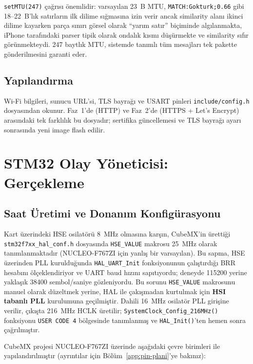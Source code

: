 \texttt{setMTU(247)} çağrısı önemlidir: varsayılan 23~B MTU,
\texttt{MATCH:Gokturk;0.66} gibi 18--22~B'lık satırların ilk dilime
sığmasına izin verir ancak similarity alanı ikinci dilime kayarken
parça sınırı görsel olarak ``yarım satır'' biçiminde algılanmakta,
iPhone tarafındaki parser tipik olarak ondalık kısmı düşürmekte ve
similarity sıfır görünmekteydi. 247 baytlık MTU, sistemde tanımlı tüm
mesajları tek pakette gönderilmesini garanti eder.

\subsection{Yapılandırma}

Wi-Fi bilgileri, sunucu URL'si, TLS bayrağı ve USART pinleri
\texttt{include/config.h} dosyasından okunur. Faz~1'de (HTTP) ve Faz~2'de
(HTTPS + Let's Encrypt) arasındaki tek farklılık bu dosyadır; sertifika
güncellemesi ve TLS bayrağı ayarı sonrasında yeni image flash edilir.

\section{STM32 Olay Yöneticisi: Gerçekleme}

\subsection{Saat Üretimi ve Donanım Konfigürasyonu}

Kart üzerindeki HSE osilatörü 8~MHz olmasına karşın, CubeMX'in
ürettiği \texttt{stm32f7xx\_hal\_conf.h} dosyasında \texttt{HSE\_VALUE}
makrosu 25~MHz olarak tanımlanmaktadır (NUCLEO-F767ZI için yanlış bir
varsayılan). Bu sapma, HSE üzerinden PLL kurulduğunda \texttt{HAL\_UART\_Init}
fonksiyonunun çalıştırdığı BRR hesabını ölçeklendiriyor ve UART baud hızını
sapıtıyordu; deneyde 115200 yerine yaklaşık 38400 sembol/saniye gözleniyordu.
Bu sorunu \texttt{HSE\_VALUE} makrosunu manuel olarak düzeltmek yerine,
HAL ile çakışmadan kurtulmak için \textbf{HSI tabanlı PLL} kurulumuna
geçilmiştir. Dahili 16~MHz osilatör PLL girişine verilir, çıkışta
216~MHz HCLK üretilir; \texttt{SystemClock\_Config\_216MHz()} fonksiyonu
\texttt{USER CODE 4} bölgesinde tanımlanmış ve \texttt{HAL\_Init()}'ten
hemen sonra çağrılmıştır.

CubeMX projesi NUCLEO-F767ZI üzerinde aşağıdaki çevre birimleri ile
yapılandırılmıştır (ayrıntılar için Bölüm~\ref{app:pin-plani}'ye bakınız):

